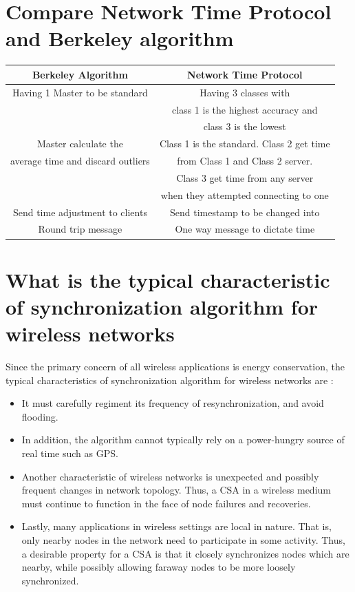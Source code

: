 \documentclass[11pt,a4paper]{report}
\begin{document}
\section{Compare Network Time Protocol and Berkeley algorithm}
\begin{tabular}{|c|c|}
\hline 
Berkeley Algorithm & Network Time Protocol \\ 
\hline 
Having 1 Master to be standard & Having 3 classes with \\ & class 1 is the highest accuracy and\\ & class 3 is the lowest \\ 
\hline 
Master calculate the & Class 1 is the standard. Class 2 get time \\ average time and discard outliers & from Class 1 and Class 2 server. \\ & Class 3 get time from any server \\ & when they attempted connecting to one \\ 
\hline 
Send time adjustment to clients  & Send timestamp to be changed into \\ 
\hline 
Round trip message & One way message to dictate time \\ 
\hline 
\end{tabular}

\section{What is the typical characteristic of synchronization algorithm for wireless networks}
Since the primary concern of all wireless applications is energy conservation, the typical characteristics of synchronization algorithm for wireless networks are :
\begin{itemize}
	\item It must carefully regiment its frequency of resynchronization, and avoid flooding. 
	\item In addition, the algorithm cannot typically rely on a power-hungry source of real time such as GPS. 
	\item Another characteristic of wireless networks is unexpected and possibly frequent changes in network topology. Thus, a CSA in a wireless medium must continue to function in the face of node failures and recoveries. 
	\item Lastly, many applications in wireless settings are local in nature. That is, only nearby nodes in the network need to participate in some activity. Thus, a desirable property for a CSA is that it closely synchronizes nodes which are nearby, while possibly allowing faraway nodes to be more loosely synchronized.
\end{itemize}
\end{document}
